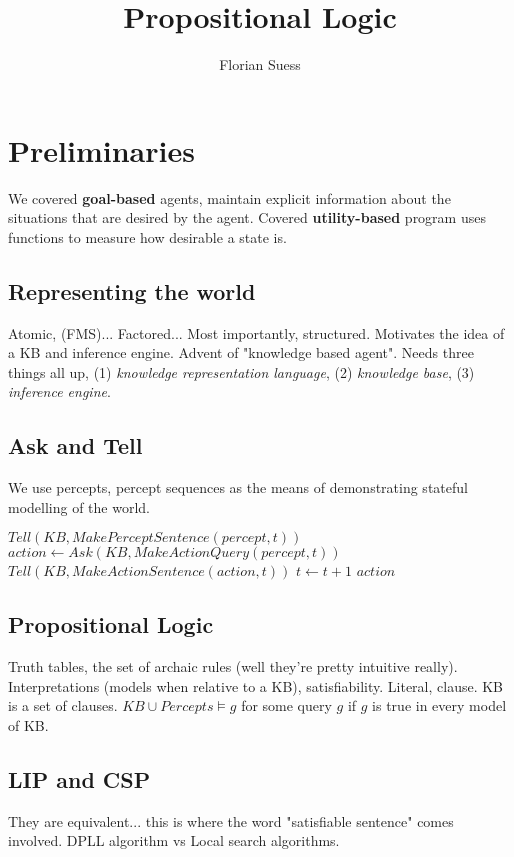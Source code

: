\documentclass{article}
\begin{document}
\title{Propositional Logic}
\date{}
\author{Florian Suess}
\maketitle

\section{Preliminaries}
We covered \textbf{goal-based} agents, maintain explicit information about the situations that are desired by the agent. Covered \textbf{utility-based} program uses functions to measure how desirable a state is.

\subsection{Representing the world}
Atomic, (FMS)... Factored... Most importantly, structured. Motivates the idea of a KB and inference engine. Advent of "knowledge based agent". Needs three things all up, (1) \emph{knowledge representation language}, (2) \emph{knowledge base}, (3) \emph{inference engine}.

\subsection{Ask and Tell}
We use percepts, percept sequences as the means of demonstrating stateful modelling of the world.

\begin{algorithmic}
	\STATE $Tell(KB, MakePerceptSentence(percept, t))$
	\STATE $action \leftarrow Ask(KB, MakeActionQuery(percept, t))$
	\STATE $Tell(KB, MakeActionSentence(action, t))$
	\STATE $t \leftarrow t + 1$
	\RETURN $action$
\end{algorithmic}

\subsection{Propositional Logic}
Truth tables, the set of archaic rules (well they're pretty intuitive really). Interpretations (models when relative to a KB), satisfiability. Literal, clause. KB is a set of clauses. $KB \cup Percepts \vDash g$ for some query $g$ if $g$ is true in every model of KB.

\subsection{LIP and CSP}
They are equivalent... this is where the word "satisfiable sentence" comes involved. DPLL algorithm vs Local search algorithms.
\end{document}
